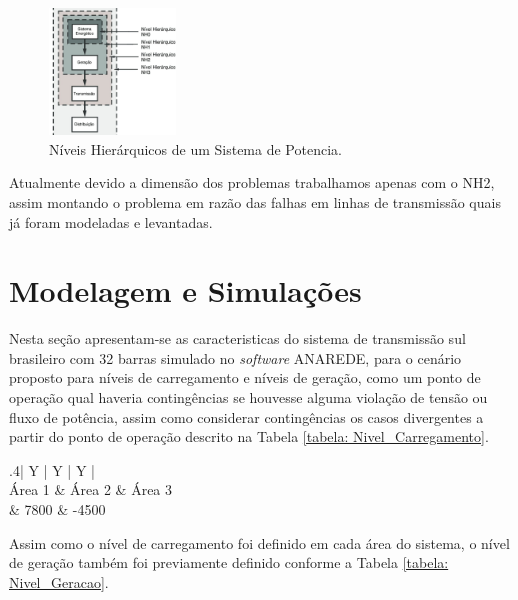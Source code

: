 \documentclass[lettersize,journal]{IEEEtran}
\begin{document}
\begin{figure}[h]
	\includegraphics[width=0.3\textwidth]{Figuras/Figura-1-Niveis-Hierarquicos-de-um-Sistema-de-Potencia.jpg}
	\centering
	\caption{Níveis Hierárquicos de um Sistema de Potencia\cite{Cassula2003}.}
	\label{figura: Niveis_Hierarquicos}
\end{figure}

Atualmente devido a dimensão dos problemas trabalhamos apenas com o NH2, assim montando o problema em razão das falhas em linhas de transmissão quais já foram modeladas e levantadas.

\section{Modelagem e Simulações}

Nesta seção apresentam-se as caracteristicas do sistema de transmissão sul brasileiro com 32 barras simulado no \textit{software} ANAREDE, para o cenário proposto para níveis de carregamento e níveis de geração, como um ponto de operação qual haveria contingências se houvesse alguma violação de tensão ou fluxo de potência, assim como considerar contingências os casos divergentes a partir do ponto de operação descrito na Tabela \ref{tabela: Nivel_Carregamento}.

\begin{table}[ht]
	\caption{Configuração do Nível de Carregamento(MW)}
	\label{tabela: Nivel_Carregamento}
	\centering
	\begin{tabularx}{.4\textwidth}{| Y | Y | Y |}
		\hline
		 \\
		\hline
		Área 1 & Área 2 & Área 3 \\
		 & 7800 & -4500 \\
		\hline
	\end{tabularx}
\end{table}

Assim como o nível de carregamento foi definido em cada área do sistema, o nível de geração também foi previamente definido conforme a Tabela \ref{tabela: Nivel_Geracao}.
\end{document}
